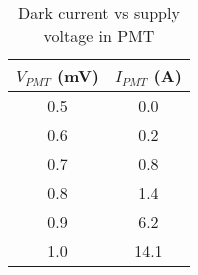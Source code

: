 \begin{table}[H]
    \centering
    \begin{tabular}{|c|c|}
    \hline
    $V_{PMT}$ (mV) & $I_{PMT}$ (A) \\ \hline
    0.5 & 0.0 \\
    0.6 & 0.2 \\
    0.7 & 0.8 \\
    0.8 & 1.4 \\
    0.9 & 6.2 \\
    1.0 & 14.1 \\ \hline
\end{tabular}
\caption{Dark current vs supply voltage in PMT}
\end{table}
